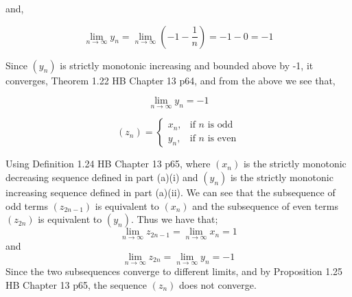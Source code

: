 \documentclass{tufte-handout}
\begin{document}
\begin{question}
and,

\[ \lim\limits_{n \to \infty} y_n = \lim\limits_{n \to \infty} \left( -1 - \frac{1}{n} \right) = -1 - 0 = -1 \]

Since \( (y_n) \) is strictly monotonic increasing and bounded above by -1, it converges, \textup{Theorem 1.22 HB Chapter 13 p64},
and from the above we see that,

\[ \lim\limits_{n \to \infty} y_n = -1 \]

\vspace{2cm}

\qpart

\begin{equation*}
    (z_n) =
\begin{cases}
 x_n, & \text{if } n \text{ is odd}\\
 y_n, & \text{if } n \text{ is even}
\end{cases}
\end{equation*}

Using \textup{Definition 1.24 HB Chapter 13 p65}, where \( (x_n) \) is the strictly monotonic decreasing sequence defined 
in part (a)(i) and \( (y_n) \) is the strictly monotonic increasing sequence defined in part (a)(ii).
We can see that the subsequence of odd terms \( (z_{2n-1}) \) is equivalent to \( (x_n) \) and the subsequence of even 
terms \( (z_{2n}) \) is equivalent to \( (y_n) \).
Thus we have that;
\[\lim\limits_{n \to \infty} z_{2n-1} = \lim\limits_{n \to \infty} x_n = 1 \]
and
\[\lim\limits_{n \to \infty} z_{2n} = \lim\limits_{n \to \infty} y_n = -1 \]
Since the two subsequences converge to different limits, and by \textup{Proposition 1.25 HB Chapter 13 p65}, the sequence \( (z_n) \) does not converge.

\end{question}

\end{document}
